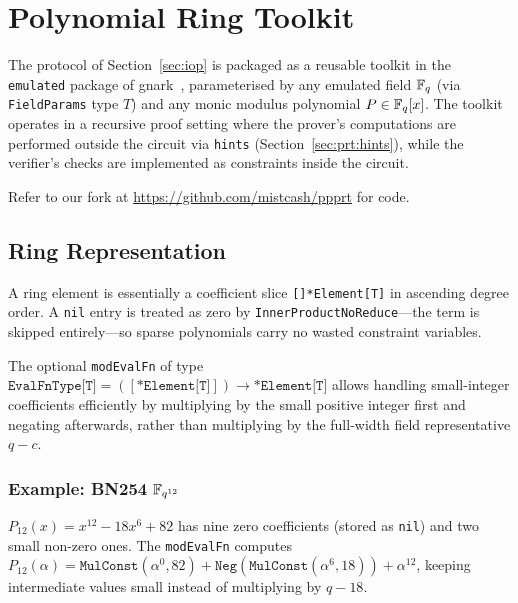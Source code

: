 
\section{Polynomial Ring Toolkit}
\label{sec:prt}

The protocol of Section~\ref{sec:iop} is packaged as a reusable toolkit in
the \texttt{emulated} package of gnark~\cite{gnaF}, parameterised by any
emulated field $\mathbb{F}_q$ (via \texttt{FieldParams} type $T$) and any monic modulus
polynomial $P \in \mathbb{F}_q[x]$. The toolkit operates in a recursive proof
setting where the prover's computations are performed outside the circuit
via \texttt{hints} (Section~\ref{sec:prt:hints}), while the verifier's
checks are implemented as constraints inside the circuit.

Refer to our fork at \url{https://github.com/mistcash/ppprt} for code.

\subsection{Ring Representation}
\label{sec:prt:rep}

A ring element is essentially a coefficient slice \texttt{[]*Element[T]} in
ascending degree order. A \texttt{nil} entry is treated as zero by
\texttt{InnerProductNoReduce}---the term is skipped entirely---so sparse
polynomials carry no wasted constraint variables.

The optional \texttt{modEvalFn} of type
$\texttt{EvalFnType[T]} = ([\texttt{*Element[T]}]) \to \texttt{*Element[T]}$
allows handling small-integer coefficients efficiently by multiplying by the small positive
integer first and negating afterwards, rather than multiplying by the
full-width field representative $q - c$.

\subsubsection*{Example: BN254 $\mathbb{F}_{q^{12}}$}
\label{sec:prt:rep:sparse}

$P_{12}(x) = x^{12} - 18x^6 + 82$ has nine zero coefficients (stored as
\texttt{nil}) and two small non-zero ones. The \texttt{modEvalFn} computes
$P_{12}(\alpha) = \texttt{MulConst}(\alpha^0, 82) + \texttt{Neg}(\texttt{MulConst}(\alpha^6, 18)) + \alpha^{12}$,
keeping intermediate values small instead of multiplying by $q - 18$.


